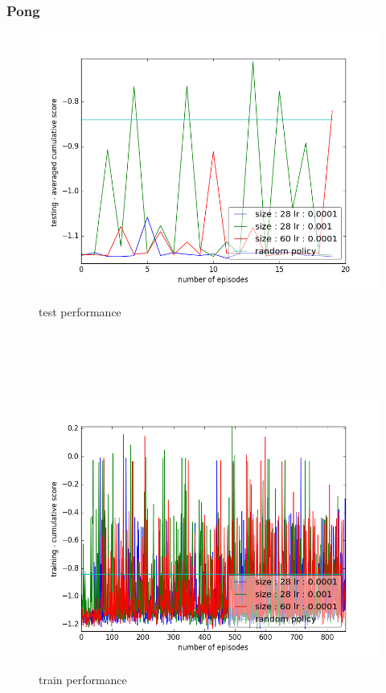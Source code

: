 \documentclass{report}
\begin{document}
\subsubsection*{Pong}

\begin{figure}[H]
\begin{minipage}[c]{.49\linewidth}
	\centering
	\includegraphics[width = \linewidth]{plots/b3/Pong-v3/testScoreMean.png}
	\caption{test performance}
    \end{minipage}
    \hfill%
\begin{minipage}[c]{.49\linewidth}
    \centering 
    \includegraphics[width = \linewidth]{plots/b3/Pong-v3/trainScore.png}
	\caption{train performance}
\end{minipage}
\end{figure}
\end{document}
